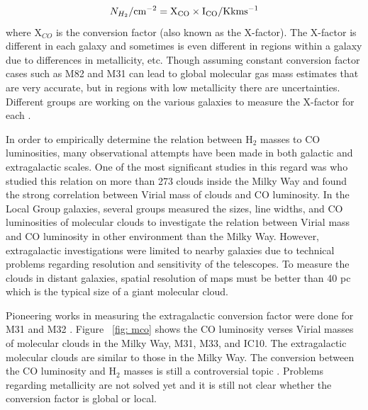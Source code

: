 \begin{equation}
N_{H_2}/\rm cm^{-2} = X_{CO} \times I_{CO}/\rm K km s^{-1}
\end{equation}
where X$_{CO}$ is the conversion factor (also known as the X-factor). The X-factor is different in each galaxy and sometimes is even different in regions within a galaxy due to differences in metallicity, etc. Though assuming constant conversion factor cases such as M82 and M31 can lead to global molecular gas mass estimates that are very accurate,  but in regions with low metallicity there are uncertainties. Different groups are working on the various galaxies to measure the X-factor for each \citep{Wilson95, Bosselli02, Bolato13}.

In order to empirically determine the relation between H$_2$ masses to CO luminosities, many observational attempts have been made in both galactic and extragalactic scales. One of the most significant studies in this regard was \cite{Solomon87} who studied this relation on more than 273 clouds inside the Milky Way and found the strong correlation between Virial mass of clouds and CO luminosity. In the Local Group galaxies, several groups measured the sizes, line widths, and CO luminosities of molecular clouds to investigate the relation between Virial mass and CO luminosity in other environment than the Milky Way. However, extragalactic investigations were limited to nearby galaxies due to technical problems regarding resolution and sensitivity of the telescopes. To measure the clouds in distant galaxies, spatial resolution of maps must be better than 40 pc which is the typical size of a giant molecular cloud. 

Pioneering works in measuring the extragalactic conversion factor were done for M31 and M32 \citep[e.g.,][]{Wilson89, Wilson90}. Figure {~\ref{fig: mco}} shows the CO luminosity verses Virial masses of molecular clouds in the Milky Way, M31, M33, and IC10. The extragalactic molecular clouds are similar to those in the Milky Way. The conversion between the CO luminosity and H$_2$ masses is still a controversial topic \citep[e.g.][]{Narayanan11, Bolato13, Sandstrom13}. Problems regarding metallicity are not solved yet and it is still not clear whether the conversion factor is global or local. 

